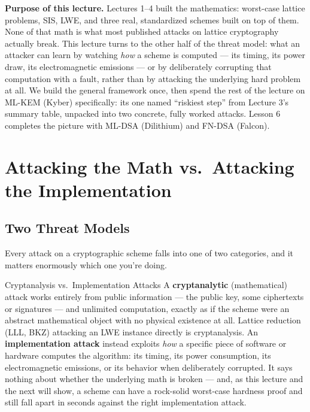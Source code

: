 \begin{notebox}
\small\textbf{Purpose of this lecture.} Lectures 1--4 built the mathematics: worst-case lattice problems, SIS, LWE, and three real, standardized schemes built on top of them. None of that math is what most published attacks on lattice cryptography actually break. This lecture turns to the other half of the threat model: what an attacker can learn by watching \emph{how} a scheme is computed --- its timing, its power draw, its electromagnetic emissions --- or by deliberately corrupting that computation with a fault, rather than by attacking the underlying hard problem at all. We build the general framework once, then spend the rest of the lecture on ML-KEM (Kyber) specifically: its one named ``riskiest step'' from Lecture 3's summary table, unpacked into two concrete, fully worked attacks. Lesson 6 completes the picture with ML-DSA (Dilithium) and FN-DSA (Falcon).
\end{notebox}

\section{Attacking the Math vs.\ Attacking the Implementation}
\label{sec:L5:attacking-the-math-vs-the-implementation}

\subsection{Two Threat Models}
\label{sec:L5:two-threat-models}

Every attack on a cryptographic scheme falls into one of two categories, and it matters enormously which one you're doing.

\begin{defbox}{Cryptanalysis vs.\ Implementation Attacks}
A \textbf{cryptanalytic} (mathematical) attack works entirely from public information --- the public key, some ciphertexts or signatures --- and unlimited computation, exactly as if the scheme were an abstract mathematical object with no physical existence at all. Lattice reduction (LLL, BKZ) attacking an LWE instance directly is cryptanalysis. An \textbf{implementation attack} instead exploits \emph{how} a specific piece of software or hardware computes the algorithm: its timing, its power consumption, its electromagnetic emissions, or its behavior when deliberately corrupted. It says nothing about whether the underlying math is broken --- and, as this lecture and the next will show, a scheme can have a rock-solid worst-case hardness proof and still fall apart in seconds against the right implementation attack.
\end{defbox}

